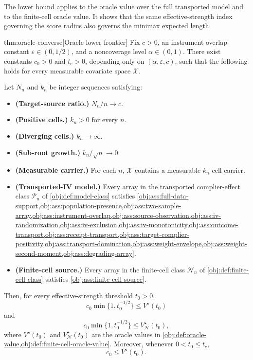 The lower bound applies to the oracle value over the full transported model and to the finite-cell oracle value. It shows that the same effective-strength index governing the score radius also governs the minimax expected length.

\begin{theoremv}{thm:oracle-converse}[Oracle lower frontier]
Fix \(c>0\), an instrument-overlap constant \(\varepsilon\in(0,1/2)\), and a noncoverage level \(\alpha\in(0,1)\). There exist constants \(c_0>0\) and \(t_c>0\), depending only on \((\alpha,\varepsilon,c)\), such that the following holds for every measurable covariate space \(\mathcal X\).

Let \(N_n\) and \(k_n\) be integer sequences satisfying:
\begin{itemize}
\item \textbf{(Target-source ratio.)} \(N_n/n\to c\).
\item \textbf{(Positive cells.)} \(k_n>0\) for every \(n\).
\item \textbf{(Diverging cells.)} \(k_n\to\infty\).
\item \textbf{(Sub-root growth.)} \(k_n/\sqrt n\to 0\).
\item \textbf{(Measurable carrier.)} For each \(n\), \(\mathcal X\) contains a measurable \(k_n\)-cell carrier.
\item \textbf{(Transported-IV model.)} Every array in the transported complier-effect class \(\mathcal P_n\) of \cref{obj:def:model-class} satisfies \cref{obj:ass:full-data-support,obj:ass:population-presence,obj:ass:two-sample-array,obj:ass:instrument-overlap,obj:ass:source-observation,obj:ass:iv-randomization,obj:ass:iv-exclusion,obj:ass:iv-monotonicity,obj:ass:outcome-transport,obj:ass:receipt-transport,obj:ass:target-complier-positivity,obj:ass:transport-domination,obj:ass:weight-envelope,obj:ass:weight-second-moment,obj:ass:degrading-array}.
\item \textbf{(Finite-cell source.)} Every array in the finite-cell class \(\mathcal N_n\) of \cref{obj:def:finite-cell-class} satisfies \cref{obj:ass:finite-cell-source}.
\end{itemize}

Then, for every effective-strength threshold \(t_0>0\),
\[
  c_0 \min\{1,t_0^{-1/2}\}
  \le V^\star(t_0)
\]
and
\[
  c_0 \min\{1,t_0^{-1/2}\}
  \le V_{\mathcal N}^\star(t_0),
\]
where \(V^\star(t_0)\) and \(V_{\mathcal N}^\star(t_0)\) are the oracle values in \cref{obj:def:oracle-value,obj:def:finite-cell-oracle-value}. Moreover, whenever \(0<t_0\le t_c\),
\[
  c_0 \le V^\star(t_0).
\]
\end{theoremv}

